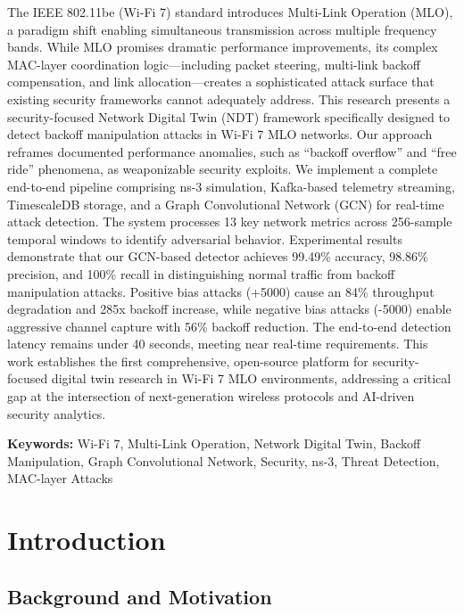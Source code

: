 \documentclass[12pt,a4paper]{article}
\begin{document}
The IEEE 802.11be (Wi-Fi 7) standard introduces Multi-Link Operation (MLO), a paradigm shift enabling simultaneous transmission across multiple frequency bands. While MLO promises dramatic performance improvements, its complex MAC-layer coordination logic---including packet steering, multi-link backoff compensation, and link allocation---creates a sophisticated attack surface that existing security frameworks cannot adequately address. This research presents a security-focused Network Digital Twin (NDT) framework specifically designed to detect backoff manipulation attacks in Wi-Fi 7 MLO networks. Our approach reframes documented performance anomalies, such as ``backoff overflow'' and ``free ride'' phenomena, as weaponizable security exploits. We implement a complete end-to-end pipeline comprising ns-3 simulation, Kafka-based telemetry streaming, TimescaleDB storage, and a Graph Convolutional Network (GCN) for real-time attack detection. The system processes 13 key network metrics across 256-sample temporal windows to identify adversarial behavior. Experimental results demonstrate that our GCN-based detector achieves 99.49\% accuracy, 98.86\% precision, and 100\% recall in distinguishing normal traffic from backoff manipulation attacks. Positive bias attacks (+5000) cause an 84\% throughput degradation and 285x backoff increase, while negative bias attacks (-5000) enable aggressive channel capture with 56\% backoff reduction. The end-to-end detection latency remains under 40 seconds, meeting near real-time requirements. This work establishes the first comprehensive, open-source platform for security-focused digital twin research in Wi-Fi 7 MLO environments, addressing a critical gap at the intersection of next-generation wireless protocols and AI-driven security analytics.

\vspace{0.5cm}
\noindent\textbf{Keywords:} Wi-Fi 7, Multi-Link Operation, Network Digital Twin, Backoff Manipulation, Graph Convolutional Network, Security, ns-3, Threat Detection, MAC-layer Attacks

\newpage
\tableofcontents
\newpage

\section{Introduction}

\subsection{Background and Motivation}
\end{document}
